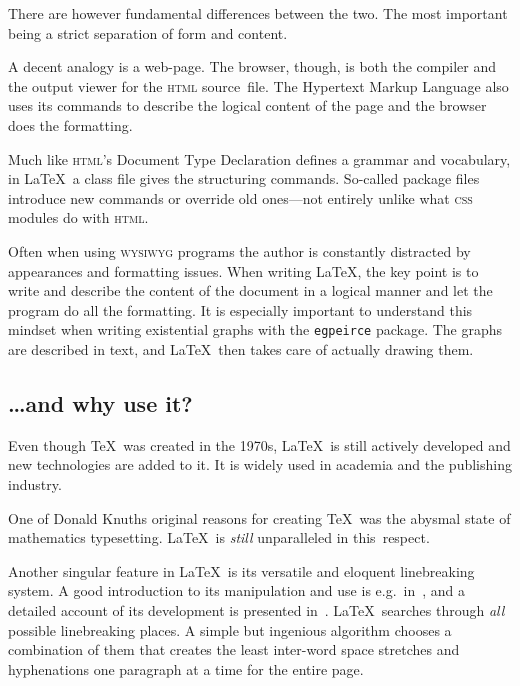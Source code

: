 \documentclass[a4paper,justified]{tufte-handout}
\begin{document}
There are however fundamental differences between the two. The most important being a strict separation of form and content.

A decent analogy is a web-page. The browser, though, is both the compiler and the output viewer for the \textsc{html} source~file. The Hypertext Markup Language also uses its commands to describe the logical content of the page and the browser does the formatting.

Much like \textsc{html}'s Document Type Declaration defines a grammar and vocabulary, in \LaTeX\ a class file gives the structuring commands. So-called package files introduce new commands or override old ones---not entirely unlike what \textsc{css} modules do with \textsc{html}.

Often when using \textsc{wysiwyg} programs the author is constantly distracted by appearances and formatting issues. When writing \LaTeX, the key point is to write and describe the content of the document in a logical manner and let the program do all the formatting. It is especially important to understand this mindset when writing existential graphs with the \texttt{egpeirce} package. The graphs are described in text, and \LaTeX\ then takes care of actually drawing them.

\subsection{\hspace*{-21pt}\dots and why use it?}

Even though \TeX\ was created in the 1970s, \LaTeX\ is still actively developed and new technologies are added to it. It is widely used in academia and the publishing industry.

One of Donald Knuths original reasons for creating \TeX\ was the abysmal state of mathematics typesetting. \LaTeX\ is \textit{still} unparalleled in this~respect.

Another singular feature in \LaTeX\ is its versatile and eloquent linebreaking system. A good introduction to its manipulation and use is e.g.\ in~\citet{knuth1984}, and a detailed account of its development is presented in~\citet[ch.\,3]{knuth1999}. \LaTeX\ searches through \textit{all} possible linebreaking places. A simple but ingenious algorithm chooses a combination of them that creates the least inter-word space stretches and hyphenations one paragraph at a time for the entire page.
\end{document}
